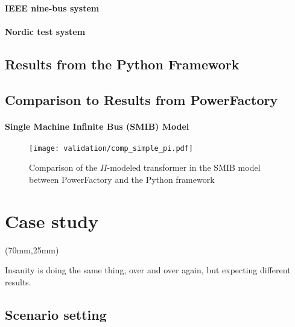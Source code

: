 \subsubsection{IEEE nine-bus system}

\subsubsection{Nordic test system}

\section{Results from the Python Framework}

\section{Comparison to Results from PowerFactory}

\subsubsection{Single Machine Infinite Bus (SMIB) Model}

\begin{figure}[htb]
    \centering
    \texttt{[image: validation/comp\_simple\_pi.pdf]}
    \caption{Comparison of the $\Pi$-modeled transformer in the \acs{SMIB} model between PowerFactory and the Python framework}
    \label{fig:comp-simple-pi}
\end{figure}


\chapter{Case study}
\label{chap:case-study}

\begin{textblock*}{.7\textwidth}(70mm,25mm)
    \begin{fquote}
        Insanity is doing the same thing, over and over again, but expecting different results.
    \end{fquote}
\end{textblock*}

\section{Scenario setting}

